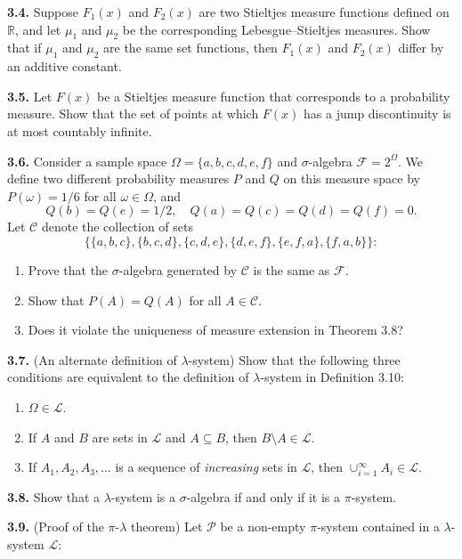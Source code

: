 \textbf{3.4.} Suppose $F_1(x)$ and $F_2(x)$ are two Stieltjes measure functions defined on $\mathbb{R}$, and let $\mu_1$ and $\mu_2$ be the corresponding Lebesgue--Stieltjes measures. Show that if $\mu_1$ and $\mu_2$ are the same set functions, then $F_1(x)$ and $F_2(x)$ differ by an additive constant.

\textbf{3.5.} Let $F(x)$ be a Stieltjes measure function that corresponds to a probability measure. Show that the set of points at which $F(x)$ has a jump discontinuity is at most countably infinite.

\textbf{3.6.} Consider a sample space $\Omega = \{a, b, c, d, e, f\}$ and $\sigma$-algebra $\mathscr{F} = 2^\Omega$. We define two different probability measures $P$ and $Q$ on this measure space by $P(\omega) = 1/6$ for all $\omega \in \Omega$, and
\[
Q(b) = Q(e) = 1/2, \quad Q(a) = Q(c) = Q(d) = Q(f) = 0.
\]
Let $\mathscr{C}$ denote the collection of sets
\[
\{\{a, b, c\}, \{b, c, d\}, \{c, d, e\}, \{d, e, f\}, \{e, f, a\}, \{f, a, b\}\} :
\]
\begin{enumerate}[label=(\alph*)]
    \item Prove that the $\sigma$-algebra generated by $\mathscr{C}$ is the same as $\mathscr{F}$.
    \item Show that $P(A) = Q(A)$ for all $A \in \mathscr{C}$.
    \item Does it violate the uniqueness of measure extension in Theorem 3.8?
\end{enumerate}

\textbf{3.7.} (An alternate definition of $\lambda$-system) Show that the following three conditions are equivalent to the definition of $\lambda$-system in Definition 3.10:
\begin{enumerate}
    \item $\Omega \in \mathcal{L}$.
    \item If $A$ and $B$ are sets in $\mathcal{L}$ and $A \subseteq B$, then $B \setminus A \in \mathcal{L}$.
    \item If $A_1, A_2, A_3, \dots$ is a sequence of \textit{increasing} sets in $\mathcal{L}$, then $\cup_{i=1}^{\infty} A_i \in \mathcal{L}$.
\end{enumerate}

\textbf{3.8.} Show that a $\lambda$-system is a $\sigma$-algebra if and only if it is a $\pi$-system.

\textbf{3.9.} (Proof of the $\pi$-$\lambda$ theorem) Let $\mathcal{P}$ be a non-empty $\pi$-system contained in a $\lambda$-system $\mathcal{L}$:



